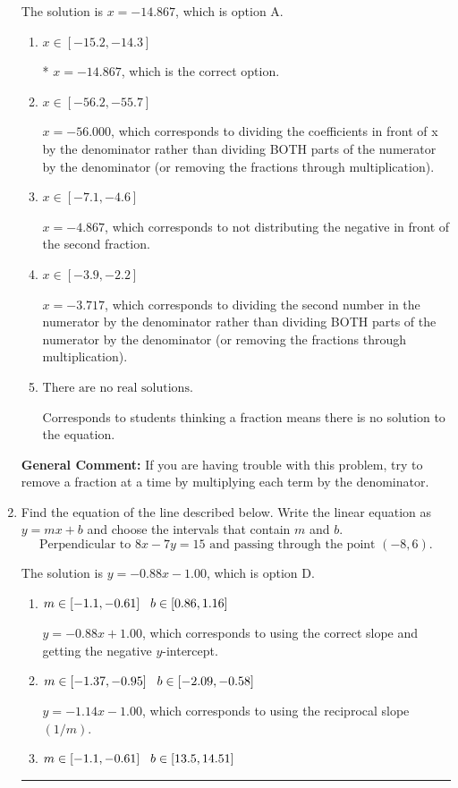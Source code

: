 \documentclass{extbook}[14pt]
\newcommand{\litem}[1]{\item #1

\rule{\textwidth}{0.4pt}}
\begin{document}
\begin{enumerate}
{The solution is \( x = -14.867 \), which is option A.\begin{enumerate}[label=\Alph*.]
\item \( x \in [-15.2, -14.3] \)

* $x = -14.867$, which is the correct option.
\item \( x \in [-56.2, -55.7] \)

 $x = -56.000$, which corresponds to dividing the coefficients in front of x by the denominator rather than dividing BOTH parts of the numerator by the denominator (or removing the fractions through multiplication).
\item \( x \in [-7.1, -4.6] \)

 $x = -4.867$, which corresponds to not distributing the negative in front of the second fraction.
\item \( x \in [-3.9, -2.2] \)

 $x = -3.717$, which corresponds to dividing the second number in the numerator by the denominator rather than dividing BOTH parts of the numerator by the denominator (or removing the fractions through multiplication).
\item \( \text{There are no real solutions.} \)

Corresponds to students thinking a fraction means there is no solution to the equation.
\end{enumerate}

\textbf{General Comment:} If you are having trouble with this problem, try to remove a fraction at a time by multiplying each term by the denominator.
}
\litem{
Find the equation of the line described below. Write the linear equation as $ y=mx+b $ and choose the intervals that contain $m$ and $b$.
\[ \text{Perpendicular to } 8 x - 7 y = 15 \text{ and passing through the point } (-8, 6). \]

The solution is \( y = -0.88x - 1.00 \), which is option D.\begin{enumerate}[label=\Alph*.]
\item \( m \in [-1.1, -0.61] \hspace*{3mm} b \in [0.86, 1.16] \)

 $y = -0.88x + 1.00$, which corresponds to using the correct slope and getting the negative $y$-intercept.
\item \( m \in [-1.37, -0.95] \hspace*{3mm} b \in [-2.09, -0.58] \)

 $y = -1.14x - 1.00$, which corresponds to using the reciprocal slope $(1/m)$.
\item \( m \in [-1.1, -0.61] \hspace*{3mm} b \in [13.5, 14.51] \)


\end{enumerate}}
\end{enumerate}
\end{document}

